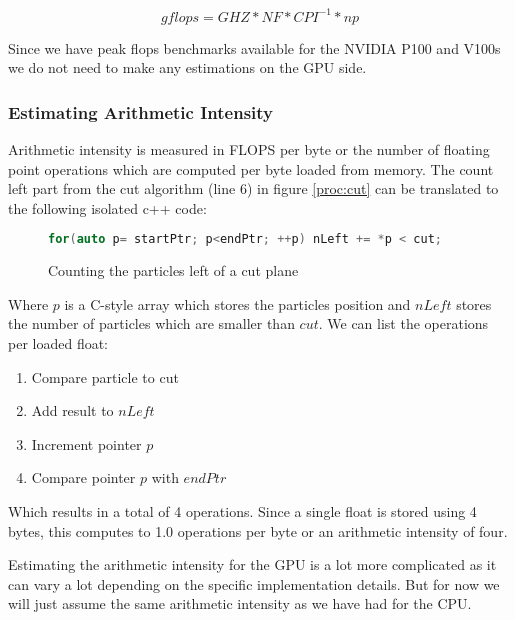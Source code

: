 \documentclass[]{article}
\begin{document}
\begin{center}
	\begin{equation}
		gflops = GHZ * NF * CPI^{-1} * np
	\end{equation}
\label{eq:avx}
\end{center}

Since we have peak flops benchmarks available for the NVIDIA P100 and V100s we do not need to make any estimations on the GPU side.

\subsubsection{Estimating Arithmetic Intensity}

Arithmetic intensity is measured in FLOPS per byte or the number of floating point operations which are computed per byte loaded from memory. The count left part from the cut algorithm (line 6) in figure \ref{proc:cut} can be translated to the following isolated c++ code:

\begin{figure}[H]
	\begin{lstlisting}[language=c++]
		for(auto p= startPtr; p<endPtr; ++p) nLeft += *p < cut;
	\end{lstlisting}
\caption{Counting the particles left of a cut plane}

\end{figure}

Where $p$ is a C-style array which stores the particles position and $nLeft$ stores the number of particles which are smaller than $cut$. We can list the operations per loaded float:

\begin{enumerate}
	\item Compare particle to cut
	\item Add result to $nLeft$
	\item Increment pointer $p$
	\item Compare pointer $p$ with $endPtr$
\end{enumerate}

Which results in a total of 4 operations. Since a single float is stored using 4 bytes, this computes to 1.0 operations per byte or an arithmetic intensity of four. 

Estimating the arithmetic intensity for the GPU is a lot more complicated as it can vary a lot depending on the specific implementation details. But for now we will just assume the same arithmetic intensity as we have had for the CPU.
\end{document}
